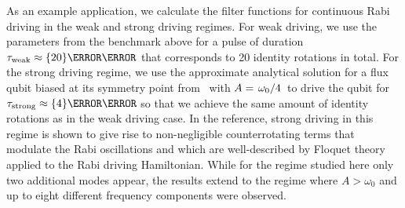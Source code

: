 
As an example application, we calculate the filter functions for continuous Rabi driving in the weak and strong driving regimes.
For weak driving, we use the parameters from the benchmark above for a pulse of duration $\tau_\mr{weak}\approx\qty{20}{\micro\second}$ that corresponds to \num{20} identity rotations in total.
For the strong driving regime, we use the approximate analytical solution for a flux qubit biased at its symmetry point from~ with $A = \flatfrac{\omega_0}{4}$ to drive the qubit for $\tau_\mr{strong}\approx\qty{4}{\nano\second}$ so that we achieve the same amount of identity rotations as in the weak driving case.
In the reference, strong driving in this regime is shown to give rise to non-negligible counterrotating terms that modulate the Rabi oscillations and which are well-described by Floquet theory applied to the Rabi driving Hamiltonian.
While for the regime studied here only two additional modes appear, the results extend to the regime where $A > \omega_0$ and up to eight different frequency components were observed.

